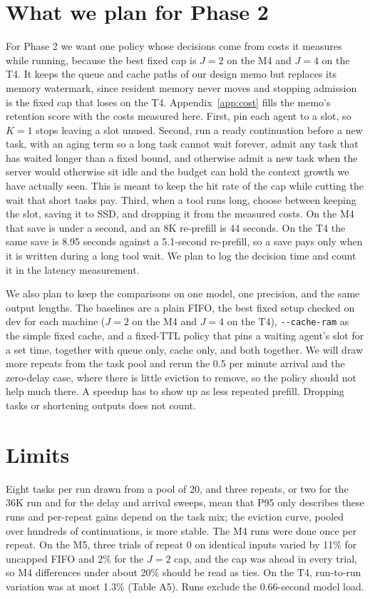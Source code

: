 \documentclass[9pt,twocolumn]{extarticle}
\begin{document}
\section{What we plan for Phase 2}

For Phase 2 we want one policy whose decisions come from costs it measures while running, because the best fixed cap is $J = 2$ on the M4 and $J = 4$ on the T4. It keeps the queue and cache paths of our design memo but replaces its memory watermark, since resident memory never moves and stopping admission is the fixed cap that loses on the T4. Appendix~\ref{app:cost} fills the memo's retention score with the costs measured here. First, pin each agent to a slot, so $K = 1$ stops leaving a slot unused. Second, run a ready continuation before a new task, with an aging term so a long task cannot wait forever, admit any task that has waited longer than a fixed bound, and otherwise admit a new task when the server would otherwise sit idle and the budget can hold the context growth we have actually seen. This is meant to keep the hit rate of the cap while cutting the wait that short tasks pay. Third, when a tool runs long, choose between keeping the slot, saving it to SSD, and dropping it from the measured costs. On the M4 that save is under a second, and an 8K re-prefill is 44 seconds. On the T4 the same save is 8.95 seconds against a 5.1-second re-prefill, so a save pays only when it is written during a long tool wait. We plan to log the decision time and count it in the latency measurement.

We also plan to keep the comparisons on one model, one precision, and the same output lengths. The baselines are a plain FIFO, the best fixed setup checked on dev for each machine ($J = 2$ on the M4 and $J = 4$ on the T4), \texttt{-{}-cache-ram} as the simple fixed cache, and a fixed-TTL policy that pins a waiting agent's slot for a set time, together with queue only, cache only, and both together. We will draw more repeats from the task pool and rerun the 0.5 per minute arrival and the zero-delay case, where there is little eviction to remove, so the policy should not help much there. A speedup has to show up as less repeated prefill. Dropping tasks or shortening outputs does not count.

\section{Limits}

Eight tasks per run drawn from a pool of 20, and three repeats, or two for the 36K run and for the delay and arrival sweeps, mean that P95 only describes these runs and per-repeat gains depend on the task mix; the eviction curve, pooled over hundreds of continuations, is more stable. The M4 runs were done once per repeat. On the M5, three trials of repeat 0 on identical inputs varied by 11\% for uncapped FIFO and 2\% for the $J = 2$ cap, and the cap was ahead in every trial, so M4 differences under about 20\% should be read as ties. On the T4, run-to-run variation was at most 1.3\% (Table A5). Runs exclude the 0.66-second model load.
\onecolumn
\appendix
\renewcommand{\thesection}{\Alph{section}}
\renewcommand{\thetable}{A\arabic{table}}
\renewcommand{\thefigure}{A\arabic{figure}}
\setcounter{table}{0}
\end{document}
